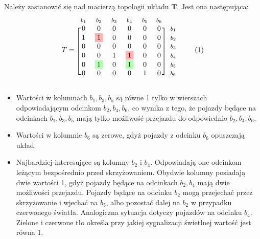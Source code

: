 \documentclass[12pt]{book}
\theoremstyle{plain}
\newcommand\addtag{\refstepcounter{equation}
\renewcommand{\labelenumii}{\theenumii}
\renewcommand{\theenumii}{\theenumi.\arabic{enumii}.}
\tag{\theequation}}
\begin{document}
Należy zastanowić się nad macierzą topologii układu $\textbf{T}$. Jest ona następująca:
\begin{equation*}
T=
\begin{blockarray}{*{6}{c} l}
\begin{block}{*{6}{>{$\footnotesize}c<{$}} l}
$b_1$ & $b_2$ & $b_3$ & $b_4$ & $b_5$ & $b_6$ \\
\end{block}
\begin{block}{[*{6}{c}]>{$\footnotesize}l<{$}}
0 & 0 & 0 & 0 & 0 & 0 & $b_1$ \\
1 & \colorbox{red!30}{1} & 0 & 0 & 0 & 0 & $b_2$ \\
0 & 0 & 0 & 0 & 0 & 0 & $b_3$ \\
0 & 0 & 1 & \colorbox{red!30}{1} & 0 & 0 & $b_4$ \\
0 & \colorbox{green!30}{1} & 0 & \colorbox{green!30}{1} & 0 & 0 & $b_5$ \\
0 & 0 & 0 & 0 & 1 & 0 & $b_6$ \\
\end{block}
\end{blockarray} \addtag
\end{equation*}
\begin{itemize}
	\item Wartości w kolumnach $b_1,b_3,b_5$ są równe 1 tylko w wierszach odpowiadającym odcinkom $b_2,b_4,b_6$, co wynika z tego, że pojazdy będące na odcinkach $b_1,b_3,b_5$ mają tylko możliwość przejazdu do odpowiednio $b_2,b_4,b_6$.
	\item Wartości w kolumnie $b_6$ są zerowe, gdyż pojazdy z odcinku $b_6$ opuszczają układ.
	\item Najbardziej interesujące są kolumny $b_2$ i $b_4$. Odpowiadają one odcinkom leżącym bezpośrednio przed skrzyżowaniem. Obydwie kolumny posiadają dwie wartości 1, gdyż pojazdy będące na odcinkach $b_2,b_4$ mają dwie możliwości przejazdu. Pojazdy będące na odcinku $b_2$ mogą przejechać przez skrzyżowanie i wjechać na $b_5$, albo pozostać dalej na $b_2$ w przypadku czerwonego światła. Analogiczna sytuacja dotyczy pojazdów na odcinku $b_4$. \colorbox{green!30}{Zielone} i \colorbox{red!30}{czerwone} tło określa przy jakiej sygnalizacji świetlnej wartość jest równa 1.
\end{itemize}
\end{document}
